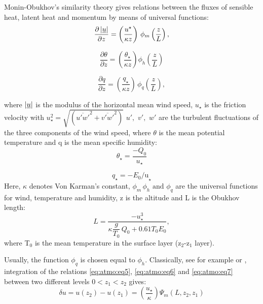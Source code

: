 Monin-Obukhov's similarity theory gives relations between the fluxes of
sensible heat, latent heat and momentum by means of universal functions:
\begin{equation}
\label{eq:atmo:eq5}
\frac{\partial \left| {\underline{u}} \right|}{\partial z} =
\left( {\frac{{u}^{{\star }} }{\kappa z}} \right) \, \phi_{m} \left(
{\dfrac{z}{L}} \right),
\end{equation}

\begin{equation}
\label{eq:atmo:eq6}
\frac{\partial {\theta }}{\partial z}=\left( {\frac{\theta_{\star}}{\kappa z}} \right)\phi_{h} \left({\frac{z}{L}} \right)
\end{equation}

\begin{equation}
\label{eq:atmo:eq7}
\frac{\partial q}{\partial z}=\left(
{\frac{q_{\star} }{\kappa z}} \right) \,
\phi_{q} \left(
{\frac{z}{L}} \right),
\end{equation}


where $\left| {\underline{u}} \right|$ is the modulus of the horizontal mean wind speed,
\newline
$u_\star $ is the friction velocity with $u_{\star}^{2} =\sqrt{(\overline{u'w'}^{2}+\overline{v'w'}^{2})}$
\newline
$u',\,\,v',\,\,w'$ are the turbulent fluctuations of the three components of the wind speed,
\newline
where $\theta$ is the mean potential temperature and q is the mean specific humidity:
\begin{equation}
\theta_{\star}=\frac{-Q_{0}}{u_{\star}}
\end{equation}

\begin{equation}
q_{\star} =-E_{0} \mbox{/u}_{\star}
\end{equation}
\newline
Here, $\kappa$ denotes Von Karman's constant, $\phi_{m} \, \phi_{h} \,\,\mbox{and}\,\,\phi_{q} $
are the universal functions for wind, temperature and humidity, z is the
altitude and L is the Obukhov length:
\begin{equation}
\label{eq:atmo:eq8}
L = \dfrac{-u_{\star}^{3}}{
  \kappa \dfrac{g}{T_{0}} \, Q_{0}
  +0.61T_{0} E_{0}
},
\end{equation}
where T$_{0}$ is the mean temperature in the surface layer (z$_{2}$-z$_{1}$
layer).

Usually, the function $\phi_{q} $ is chosen equal to $\phi
_{h} $. Classically, see for example \cite{Garratt:1992} or \cite{Cheng:2005},
integration of the relations \eqref{eq:atmo:eq5}, \eqref{eq:atmo:eq6} and \eqref{eq:atmo:eq7}
between two different levels $0<z_{1} <z_{2} $ gives:
\begin{equation}
\label{eq:atmo:eq9}
\delta u=u(z_2)-u(z_1)=
\left(\frac {u_{\star}}{\kappa} \right)\Psi_{m}\left({L,z_2,z_1} \right)
\end{equation}

